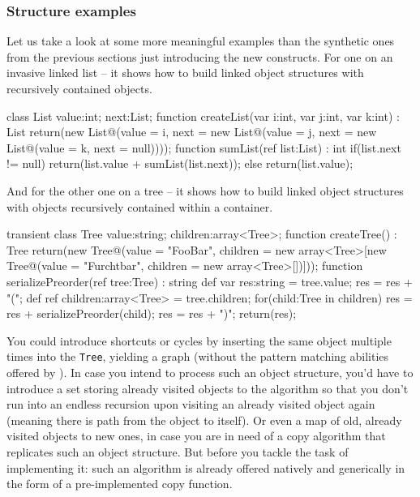 

\subsubsection{Structure examples}

Let us take a look at some more meaningful examples than the synthetic ones from the previous sections just introducing the new constructs.
For one on an invasive linked list -- it shows how to build linked object structures with recursively contained objects.

\begin{example}
\begin{grgen}
class List {
  value:int;
  next:List;
}
function createList(var i:int, var j:int, var k:int) : List
{
  return(new List@(value = i, next = new List@(value = j, next = new List@(value = k, next = null))));
}
function sumList(ref list:List) : int
{
  if(list.next != null) {
    return(list.value + sumList(list.next));
  } else {
    return(list.value);
  }
}
\end{grgen}
\end{example}

And for the other one on a tree -- it shows how to build linked object structures with objects recursively contained within a container.

\begin{example}
\begin{grgen}
transient class Tree {
  value:string;
  children:array<Tree>;
}
function createTree() : Tree
{
  return(new Tree@(value = "FooBar", children = new array<Tree>[new Tree@(value = "Furchtbar", children = new array<Tree>[])]));
}
function serializePreorder(ref tree:Tree) : string
{
  def var res:string = tree.value;
  res = res + "(";
  def ref children:array<Tree> = tree.children;
  for(child:Tree in children)
  {
    res = res + serializePreorder(child);
  }
  res = res + ")";
  return(res);
}
\end{grgen}
\end{example}

You could introduce shortcuts or cycles by inserting the same object multiple times into the \texttt{Tree}, yielding a graph (without the pattern matching abilities offered by \GrG).
In case you intend to process such an object structure, you'd have to introduce a set storing already visited objects to the algorithm so that you don't run into an endless recursion upon visiting an already visited object again (meaning there is path from the object to itself).
Or even a map of old, already visited objects to new ones, in case you are in need of a copy algorithm that replicates such an object structure.
But before you tackle the task of implementing it: such an algorithm is already offered natively and generically in the form of a pre-implemented copy function.


